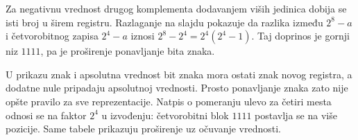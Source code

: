 Za negativnu vrednost drugog komplementa dodavanjem viših jedinica dobija se isti broj u širem registru. Razlaganje na slajdu pokazuje da razlika između $2^8-a$ i četvorobitnog zapisa $2^4-a$ iznosi $2^8-2^4=2^4(2^4-1)$. Taj doprinos je gornji niz $1111$, pa je proširenje ponavljanje bita znaka.

U prikazu znak i apsolutna vrednost bit znaka mora ostati znak novog registra, a dodatne nule pripadaju apsolutnoj vrednosti. Prosto ponavljanje znaka zato nije opšte pravilo za sve reprezentacije. Natpis o pomeranju ulevo za četiri mesta odnosi se na faktor $2^4$ u izvođenju: četvorobitni blok $1111$ postavlja se na više pozicije. Same tabele prikazuju proširenje uz očuvanje vrednosti.
